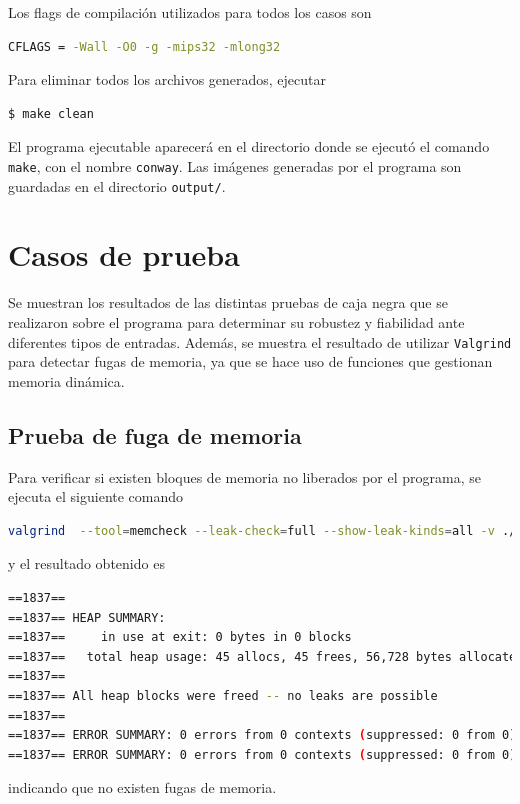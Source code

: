 Los flags de compilación utilizados para todos los casos son
\begin{lstlisting}[language=bash, style=StyleC]
CFLAGS = -Wall -O0 -g -mips32 -mlong32
\end{lstlisting}

Para eliminar todos los archivos generados, ejecutar
\begin{lstlisting}[language=bash, style=StyleC]
$ make clean
\end{lstlisting}

El programa ejecutable aparecerá en el directorio donde se ejecutó el comando \texttt{make}, con el nombre \texttt{conway}. Las imágenes generadas por el programa son guardadas en el directorio \texttt{output/}.

\clearpage
\section{Casos de prueba}

Se muestran los resultados de las distintas pruebas de caja negra que se realizaron sobre el programa para determinar su robustez y fiabilidad ante diferentes tipos de entradas. Además, se muestra el resultado de utilizar \texttt{Valgrind} para detectar fugas de memoria, ya que se hace uso de funciones que gestionan memoria dinámica.

\subsection{Prueba de fuga de memoria}

Para verificar si existen bloques de memoria no liberados por el programa, se ejecuta el siguiente comando
\begin{lstlisting}[language=bash, style=StyleC]
valgrind  --tool=memcheck --leak-check=full --show-leak-kinds=all -v ./conway 10 20 20 glider -o estado
\end{lstlisting}
y el resultado obtenido es
\begin{lstlisting}[language=bash, style=StyleC]
==1837== 
==1837== HEAP SUMMARY:
==1837==     in use at exit: 0 bytes in 0 blocks
==1837==   total heap usage: 45 allocs, 45 frees, 56,728 bytes allocated
==1837== 
==1837== All heap blocks were freed -- no leaks are possible
==1837== 
==1837== ERROR SUMMARY: 0 errors from 0 contexts (suppressed: 0 from 0)
==1837== ERROR SUMMARY: 0 errors from 0 contexts (suppressed: 0 from 0)
\end{lstlisting}
indicando que no existen fugas de memoria.




